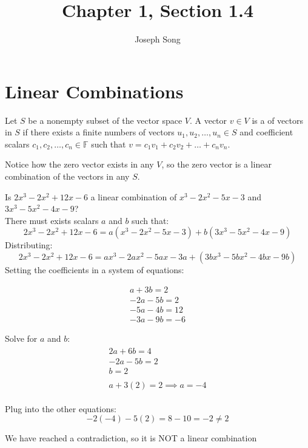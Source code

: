 \documentclass{article}
\title{Chapter 1, Section 1.4}
\author{Joseph Song}
\date{}
\begin{document}
 
\maketitle

\section{Linear Combinations}
\begin{definition}
    Let $S$ be a nonempty subset of the vector space $V$. A vector $v \in V$ is a  of vectors in $S$ if there exists a finite numbers of vectors $u_1, u_2, \dots, u_n \in S$ and coefficient scalars $c_1, c_2,\dots, c_n \in \mathbb{F}$ such that $v = c_1v_1 + c_2v_2+\dots+c_nv_n$.
\end{definition}

Notice how the zero vector exists in any $V$, so the zero vector is a linear combination of the vectors in any $S$.

\begin{example}[Polynomials]
\end{example}

Is $2x^3 -2x^2+12x-6$ a linear combination of $x^3-2x^2-5x-3$ and $3x^3-5x^2-4x-9$?
\\
There must exists scalars $a$ and $b$ such that:
\[
2x^3 -2x^2+12x-6 = a(x^3-2x^2-5x-3) + b(3x^3-5x^2-4x-9)
\]
Distributing:
\[
2x^3 -2x^2+12x-6 = ax^3-2ax^2-5ax-3a + (3bx^3-5bx^2-4bx-9b)
\]
Setting the coefficients in a system of equations:

\begin{align*}
   a+3b=2 \\
   -2a-5b=2 \\
   -5a-4b=12 \\
   -3a-9b=-6
\end{align*}

Solve for $a$ and $b$:
\begin{align*}
\begin{array}{c}
    2a+6b=4 \\
   -2a-5b=2 \\
   \hline
   b = 2\\ 
   \\
   a + 3(2) = 2 \implies a = -4
\end{array}
\end{align*}


Plug into the other equations:
\[
-2(-4) - 5 (2) = 8 - 10 = -2 \neq 2
\]

We have reached a contradiction, so it is NOT a linear combination
\end{document}
